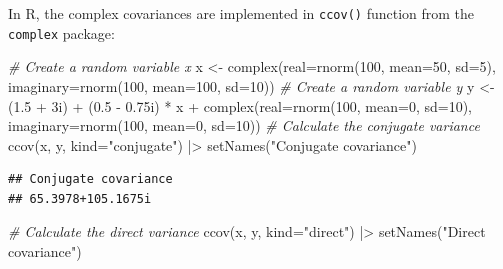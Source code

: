 \documentclass[
]{book}
\newenvironment{Shaded}{\begin{snugshade}}{\end{snugshade}}
\newcommand{\AttributeTok}[1]{\textcolor[rgb]{0.77,0.63,0.00}{#1}}
\newcommand{\CommentTok}[1]{\textcolor[rgb]{0.56,0.35,0.01}{\textit{#1}}}
\newcommand{\DecValTok}[1]{\textcolor[rgb]{0.00,0.00,0.81}{#1}}
\newcommand{\FloatTok}[1]{\textcolor[rgb]{0.00,0.00,0.81}{#1}}
\newcommand{\FunctionTok}[1]{\textcolor[rgb]{0.00,0.00,0.00}{#1}}
\newcommand{\NormalTok}[1]{#1}
\newcommand{\OtherTok}[1]{\textcolor[rgb]{0.56,0.35,0.01}{#1}}
\newcommand{\SpecialCharTok}[1]{\textcolor[rgb]{0.00,0.00,0.00}{#1}}
\newcommand{\StringTok}[1]{\textcolor[rgb]{0.31,0.60,0.02}{#1}}
\begin{document}
In R, the complex covariances are implemented in \texttt{ccov()} function from the \texttt{complex} package:

\begin{Shaded}
\begin{Highlighting}[]
\CommentTok{\# Create a random variable x}
\NormalTok{x }\OtherTok{\textless{}{-}} \FunctionTok{complex}\NormalTok{(}\AttributeTok{real=}\FunctionTok{rnorm}\NormalTok{(}\DecValTok{100}\NormalTok{, }\AttributeTok{mean=}\DecValTok{50}\NormalTok{, }\AttributeTok{sd=}\DecValTok{5}\NormalTok{),}
             \AttributeTok{imaginary=}\FunctionTok{rnorm}\NormalTok{(}\DecValTok{100}\NormalTok{, }\AttributeTok{mean=}\DecValTok{100}\NormalTok{, }\AttributeTok{sd=}\DecValTok{10}\NormalTok{))}
\CommentTok{\# Create a random variable y}
\NormalTok{y }\OtherTok{\textless{}{-}}\NormalTok{ (}\FloatTok{1.5} \SpecialCharTok{+}\NormalTok{ 3i) }\SpecialCharTok{+}\NormalTok{ (}\FloatTok{0.5} \SpecialCharTok{{-}} \FloatTok{0.75}\NormalTok{i) }\SpecialCharTok{*}\NormalTok{ x }\SpecialCharTok{+}
            \FunctionTok{complex}\NormalTok{(}\AttributeTok{real=}\FunctionTok{rnorm}\NormalTok{(}\DecValTok{100}\NormalTok{, }\AttributeTok{mean=}\DecValTok{0}\NormalTok{, }\AttributeTok{sd=}\DecValTok{10}\NormalTok{),}
                    \AttributeTok{imaginary=}\FunctionTok{rnorm}\NormalTok{(}\DecValTok{100}\NormalTok{, }\AttributeTok{mean=}\DecValTok{0}\NormalTok{, }\AttributeTok{sd=}\DecValTok{10}\NormalTok{))}
\CommentTok{\# Calculate the conjugate variance}
\FunctionTok{ccov}\NormalTok{(x, y, }\AttributeTok{kind=}\StringTok{"conjugate"}\NormalTok{) }\SpecialCharTok{|\textgreater{}}
    \FunctionTok{setNames}\NormalTok{(}\StringTok{"Conjugate covariance"}\NormalTok{)}
\end{Highlighting}
\end{Shaded}

\begin{verbatim}
## Conjugate covariance 
## 65.3978+105.1675i
\end{verbatim}

\begin{Shaded}
\begin{Highlighting}[]
\CommentTok{\# Calculate the direct variance}
\FunctionTok{ccov}\NormalTok{(x, y, }\AttributeTok{kind=}\StringTok{"direct"}\NormalTok{) }\SpecialCharTok{|\textgreater{}}
    \FunctionTok{setNames}\NormalTok{(}\StringTok{"Direct covariance"}\NormalTok{)}
\end{Highlighting}
\end{Shaded}
\end{document}

